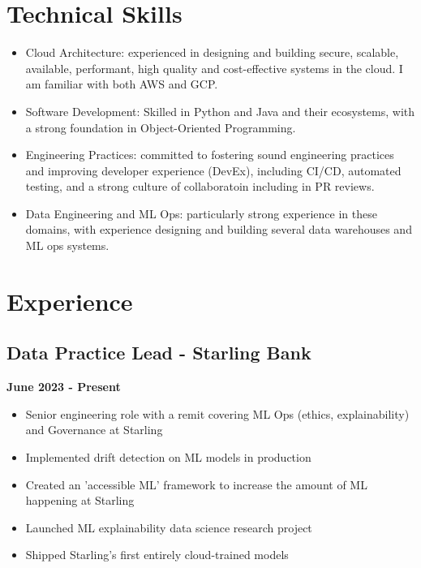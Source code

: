 \documentclass[a4paper]{scrartcl}
\begin{document}
\section*{Technical Skills}
\begin{itemize}
      \item Cloud Architecture: experienced in designing and building secure,
            scalable, available, performant, high quality and cost-effective systems in the
            cloud. I am familiar with both AWS and GCP.
      \item Software Development: Skilled in Python and Java and their
            ecosystems, with a
            strong foundation in Object-Oriented Programming.
      \item Engineering Practices: committed to fostering sound engineering
            practices and improving developer experience (DevEx), including CI/CD,
            automated testing, and a strong culture of collaboratoin including in PR
            reviews.
      \item Data Engineering and ML Ops: particularly strong experience in
            these domains, with experience designing and building several data warehouses
            and ML ops systems.
\end{itemize}

\section*{Experience}

\subsection*{Data Practice Lead - Starling Bank}
\textbf{June 2023 - Present}
\begin{itemize}
      \item Senior engineering role with a remit covering ML Ops
            (ethics,
            explainability) and Governance at Starling
      \item Implemented drift detection on ML models in production
      \item Created an 'accessible ML' framework to increase the amount of ML
            happening at Starling
      \item Launched ML explainability data science research project
      \item Shipped Starling's first entirely cloud-trained models
\end{itemize}
\end{document}
